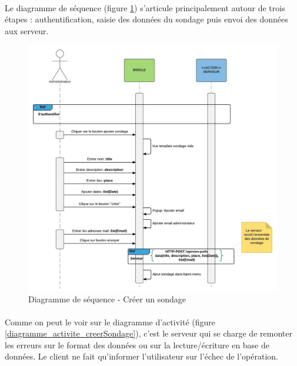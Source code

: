 \documentclass[titlepage]{report}
\begin{document}
\paragraph{} Le diagramme de séquence (figure \ref{diagramme_sequence_creerSondage}) s'articule principalement autour de trois étapes : authentification, saisie des données du sondage puis envoi des données aux serveur.

\begin{figure}[h]
	\caption{Diagramme de séquence - Créer un sondage}
	\label{diagramme_sequence_creerSondage}
	\centering
	\includegraphics[width=\textwidth]{figures/diagrammes/sequence_creerSondage.png}
\end{figure}

\paragraph{} Comme on peut le voir sur le diagramme d'activité (figure \ref{diagramme_activite_creerSondage}), c'est le serveur qui se charge de remonter les erreurs sur le format des données ou sur la lecture/écriture en base de données. Le client ne fait qu'informer l'utilisateur sur l'échec de l'opération.
\end{document}
